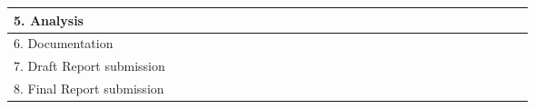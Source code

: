 \documentclass[../main/main.tex]{subfiles}
\begin{document}
\begin{table}[h!]
\begin{adjustbox}{angle=90, width=.75\textwidth}
\begin{tabular}{|c|c|c|c|c|c|c|c|c|c|c|c|c|c|c|c|c|c|c|c|c|c|c|c|c|c|c|c|c|c|}
				\hline 
				\hline
				\multicolumn{2}{|l|}{ 5. Analysis} & & & & & & & & & & & & & &\cellcolor[HTML]{C14F33} &\cellcolor[HTML]{C14F33} &\cellcolor[HTML]{C14F33}& \cellcolor[HTML]{C14F33}& \cellcolor[HTML]{C14F33}& \cellcolor[HTML]{C14F33}& \cellcolor[HTML]{C14F33}& & & & & & & & \\
				\hline
				\hline
				\multicolumn{2}{|l|}{ 6. Documentation} & & & & & & & & & & & & &\cellcolor[HTML]{A2C0E7} & \cellcolor[HTML]{A2C0E7}&\cellcolor[HTML]{A2C0E7} &\cellcolor[HTML]{A2C0E7} &\cellcolor[HTML]{A2C0E7} &\cellcolor[HTML]{A2C0E7} &\cellcolor[HTML]{A2C0E7} &\cellcolor[HTML]{A2C0E7} &\cellcolor[HTML]{A2C0E7} &\cellcolor[HTML]{A2C0E7} &\cellcolor[HTML]{A2C0E7} &\cellcolor[HTML]{A2C0E7} & & & & \\
				\hline
				\multicolumn{2}{|l|}{7. Draft Report submission } & & & & & & & & & & & & & & & & & & & & & & & & & \cellcolor[HTML]{12345A}& & & \\
				\hline
				\multicolumn{2}{|l|}{8. Final Report submission } & & & & & & & & & & & & & & & & & & & & & & & & & &\cellcolor[HTML]{123456} & & \\
				\hline
			\end{tabular}
		\end{adjustbox}
	

	\end{table}
\end{document}
